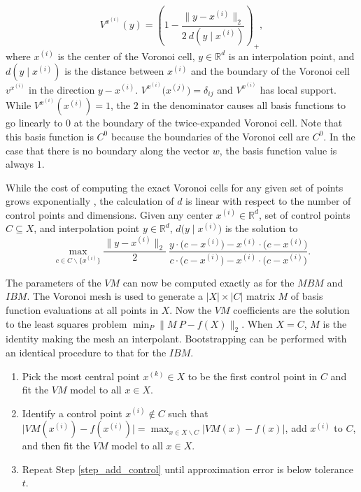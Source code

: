 $$ V^{x^{(i)}}(y) = \left(1 - \frac{\bigl\|y - x^{(i)}\bigr\|_2}{2 \ d(y \mid x^{(i)})} \right)_+, $$
where $x^{(i)}$ is the center of the Voronoi cell, $y \in \mathbb{R}^d$ is an interpolation point, and $d(y \mid x^{(i)})$ is the distance between $x^{(i)}$ and the boundary of the Voronoi cell $v^{x^{(i)}}$ in the direction $y - x^{(i)}$. $V^{x^{(i)}}\bigl(x^{(j)}\bigr) = \delta_{ij}$ and $V^{x^{(i)}}$ has local support. While $V^{x^{(i)}}(x^{(i)}) = 1$, the $2$ in the denominator causes all basis functions to go linearly to $0$ at the boundary of the twice-expanded Voronoi cell. Note that this basis function is $C^0$ because the boundaries of the Voronoi cell are $C^0$. In the case that there is no boundary along the vector $w$, the basis function value is always $1$.

While the cost of computing the exact Voronoi cells for any given set of points grows exponentially \cite{dutour2009complexity}, the calculation of $d$ is linear with respect to the number of control points and dimensions. Given any center $x^{(i)} \in \mathbb{R}^d$, set of control points $C \subseteq X$, and interpolation point $y \in \mathbb{R}^d$, $d\bigl(y \mid x^{(i)}\bigr)$ is the solution to
\begin{equation}
  \max_{c \in C\backslash\{x^{(i)}\}} \frac{\bigl\|y - x^{(i)}\bigr\|_2}{2} \ \frac{y \cdot \bigl(c - x^{(i)}\bigr) - x^{(i)} \cdot \bigl(c - x^{(i)}\bigr)}{c \cdot \bigl(c - x^{(i)}\bigr) - x^{(i)} \cdot \bigl(c - x^{(i)}\bigr)}.
\end{equation}

The parameters of the $VM$ can now be computed exactly as for the $MBM$ and $IBM$. The Voronoi mesh is used to generate a $|X| \times |C|$ matrix $M$ of basis function evaluations at all points in $X$. Now the $VM$ coefficients are the solution to the least squares problem $\min_P \bigl\| M \ P - f(X) \bigr\|_2$. When $X = C$, $M$ is the identity making the mesh an interpolant. Bootstrapping can be performed with an identical procedure to that for the $IBM$.
\begin{enumerate}
\item Pick the most central point $x^{(k)} \in X$ to be the first control point in $C$ and fit the $VM$ model to all $x \in X$.
\item Identify a control point $x^{(i)} \notin C$ such that $\bigl| VM(x^{(i)}) - f(x^{(i)}) \bigr| = \max_{x \in X \backslash C} \bigl| VM(x) - f(x) \bigr|$, add $x^{(i)}$ to $C$, and then fit the $VM$ model to all $x \in X$. \label{step_add_control}
\item Repeat Step \ref{step_add_control} until approximation error is below tolerance $t$.
\end{enumerate}

